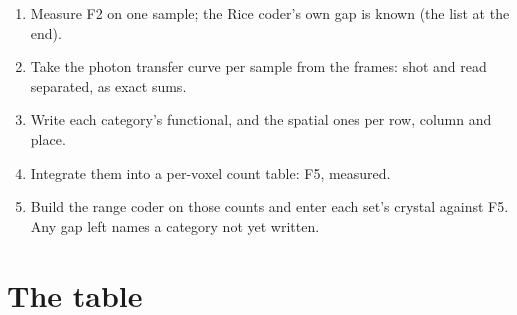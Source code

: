 \begin{enumerate}
\item Measure F2 on one sample; the Rice coder's own gap is known (the list at the end).
\item Take the photon transfer curve per sample from the frames: shot and read separated, as exact sums.
\item Write each category's functional, and the spatial ones per row, column and place.
\item Integrate them into a per-voxel count table: F5, measured.
\item Build the range coder on those counts and enter each set's crystal against F5. Any gap left names a category not yet written.
\end{enumerate}

\section{\texorpdfstring{The table}{The table}}

